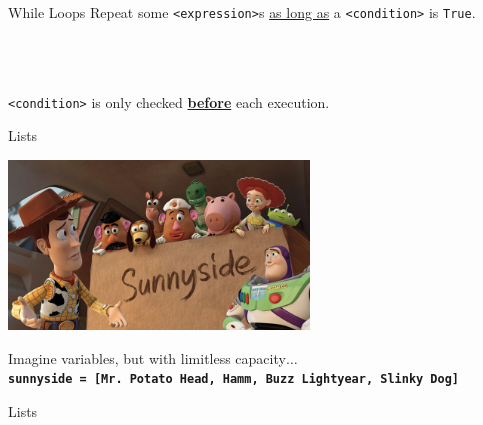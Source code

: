         \begin{frame}{While Loops}
            Repeat some \texttt{<expression>}s \underline{as long as} a \texttt{<condition>} is \texttt{True}.
            \begin{columns}
                \begin{column}{0.45\textwidth}
                    \inputminted[frame=single,framesep=2pt]{python3}{../Lecture3/code-examples/while1.py}
                \end{column}
                \begin{column}{0.45\textwidth}
                    \inputminted[frame=single,framesep=2pt]{python3}{../Lecture3/code-examples/while2.py}
                \end{column} 
            \end{columns}
            \LARGE
            \inputminted[frame=single,framesep=2pt]{python3}{../Lecture3/code-examples/while3.py}
            \texttt{<condition>} is only checked \textbf{\underline{before}} each execution.
        \end{frame}

        \begin{frame}{Lists}
            \begin{center}
                \includegraphics[width=0.6\textwidth]{../Lecture1/images/box_many.jpg}                
            \end{center}
            \LARGE
            Imagine variables, but with limitless capacity$\dots$\\
            \textbf{\texttt{sunnyside = [\textquotesingle Mr. Potato Head\textquotesingle, \textquotesingle Hamm\textquotesingle,
            \textquotesingle Buzz Lightyear\textquotesingle, \textquotesingle Slinky Dog\textquotesingle]}}
        \end{frame}

        \begin{frame}{Lists}
            \huge
            \inputminted[frame=single,framesep=2pt]{python3}{../Lecture3/code-examples/intro_lists.py}
            \inputminted[frame=single,framesep=2pt]{python3}{../Lecture3/code-examples/mixed_list.py}
        \end{frame}

